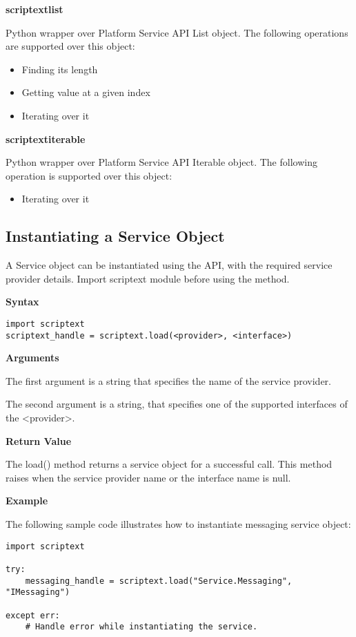 {\bf scriptextlist} \break

Python wrapper over Platform Service API List object. The following operations are supported over this object:

\begin{itemize}
\item Finding its length
\item Getting value at a given index
\item Iterating over it
\end{itemize}

{\bf scriptextiterable} \break

Python wrapper over Platform Service API Iterable object. The following operation is supported over this object:

\begin{itemize}
\item Iterating over it
\end{itemize}

\subsection{Instantiating a Service Object}
\label{subsec:pyservice}

A Service object can be instantiated using the  API, with the required service provider details. Import scriptext module before using the method.

{\bf Syntax} \break

\begin{verbatim}
import scriptext
scriptext_handle = scriptext.load(<provider>, <interface>)
\end{verbatim}

{\bf Arguments} \break

The first argument is a string that specifies the name of the service provider. \break

The second argument is a string, that specifies one of the supported interfaces of the <provider>.

{\bf Return Value} \break

The load() method returns a service object for a successful call. This method raises  when the service provider name or the interface name is null.

{\bf Example} \break

The following sample code illustrates how to instantiate messaging service object:

\begin{verbatim}
import scriptext

try:
    messaging_handle = scriptext.load("Service.Messaging", "IMessaging")

except err:
    # Handle error while instantiating the service.
\end{verbatim}

